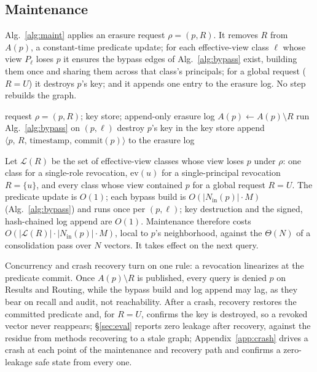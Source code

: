 \documentclass[sigconf, nonacm, review]{acmart}
\newcommand{\Nin}{N_{\mathrm{in}}}
\newif\ifextended\extendedtrue %
\begin{document}
\subsection{Maintenance}

Alg.~\ref{alg:maint} applies an erasure request $\rho=(p,R)$. It
removes $R$ from $A(p)$, a constant-time predicate update; for each effective-view
class $\ell$ whose view $P_\ell$ loses $p$ it ensures the bypass edges of
Alg.~\ref{alg:bypass} exist, building them once and sharing them across
that class's principals; for a global request ($R=U$) it destroys $p$'s key;
and it appends one entry to the erasure log. No step rebuilds the graph.

\begin{algorithm}
\caption{Maintenance for an erasure request}
\label{alg:maint}
\begin{algorithmic}[1]
\Require request $\rho=(p,R)$; key store; append-only erasure log
\State $A(p) \gets A(p)\setminus R$ 
 
    \State run Alg.~\ref{alg:bypass} on $(p,\ell)$
  \EndIf
\EndFor
{}
  \State destroy $p$'s key in the key store 
\EndIf
\State append $\langle p,\,R,\,\text{timestamp},\,\mathrm{commit}(p)\rangle$ to the erasure log
\end{algorithmic}
\end{algorithm}

Let $\mathcal{L}(R)$ be the set of effective-view classes whose view loses $p$
under $\rho$: one class for a single-role revocation, $\mathrm{ev}(u)$ for a
single-principal revocation $R=\{u\}$, and every class whose view contained $p$ for a global request $R=U$. The
predicate update is $O(1)$; each bypass build is $O(|\Nin(p)|\cdot M)$
(Alg.~\ref{alg:bypass}) and runs once per $(p,\ell)$; key destruction
and the signed, hash-chained log append are $O(1)$. Maintenance therefore
costs $O(|\mathcal{L}(R)|\cdot|\Nin(p)|\cdot M)$, local to $p$'s
neighborhood, against the $\Theta(N)$ of a consolidation pass over $N$
vectors. It takes effect on the next query.

Concurrency and crash recovery turn on one rule: a revocation linearizes at
the predicate commit. Once $A(p)\setminus R$ is published, every query
is denied $p$ on Results and Routing, while the bypass build and log append
may lag, as they bear on recall and audit, not reachability. After a
crash, recovery restores the committed predicate and, for $R=U$, confirms the
key is destroyed, so a revoked vector never reappears; \S\ref{sec:eval}
reports zero leakage after recovery, against the residue from methods recovering to a stale graph\ifextended; Appendix~\ref{app:crash} drives a crash at each point of the maintenance and recovery path and confirms a zero-leakage safe state from every one\fi.
\end{document}
